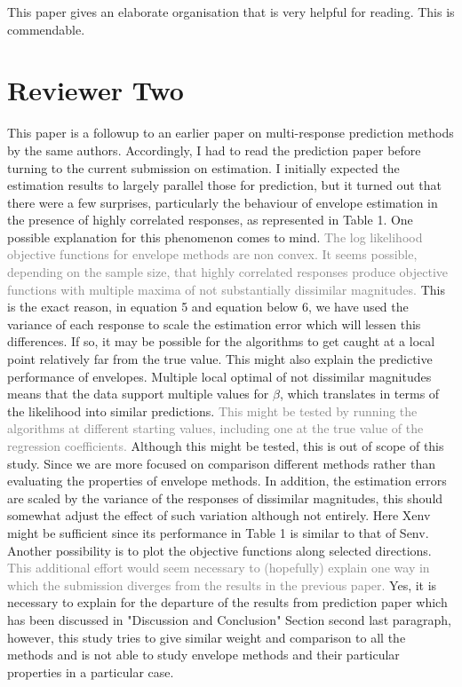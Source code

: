 \documentclass[12pt, a4paper]{scrartcl}
\begin{document}
This paper gives an elaborate organisation that is very helpful for reading. This is commendable.

\section{Reviewer Two}

This paper is a followup to an earlier paper on multi-response prediction methods by the same authors. Accordingly, I had to read the prediction paper before turning to the current submission on estimation. I initially expected the estimation results to largely parallel those for prediction, but it turned out that there were a few surprises, particularly the behaviour of envelope estimation in the presence of highly correlated responses, as represented in Table 1. One possible explanation for this phenomenon comes to mind. \textcolor{gray}{The log likelihood objective functions for envelope methods are non convex. It seems possible, depending on the sample size, that highly correlated responses produce objective functions with multiple maxima of not substantially dissimilar magnitudes.} \textcolor{answers}{This is the exact reason, in equation 5 and equation below 6, we have used the variance of each response to scale the estimation error which will lessen this differences.} If so, it may be possible for the algorithms to get caught at a local point relatively far from the true value. This might also explain the predictive performance of envelopes. Multiple local optimal of not dissimilar magnitudes means that the data support multiple values for $\beta$, which translates in terms of the likelihood into similar predictions. \textcolor{gray}{This might be tested by running the algorithms at different starting values, including one at the true value of the regression coefficients.} \textcolor{answers}{Although this might be tested, this is out of scope of this study. Since we are more focused on comparison different methods rather than evaluating the properties of envelope methods. In addition, the estimation errors are scaled by the variance of the responses of dissimilar magnitudes, this should somewhat adjust the effect of such variation although not entirely.} Here Xenv might be sufficient since its performance in Table 1 is similar to that of Senv. Another possibility is to plot the objective functions along selected directions. \textcolor{gray}{This additional effort would seem necessary to (hopefully) explain one way in which the submission diverges from the results in the previous paper.} \textcolor{answers}{Yes, it is necessary to explain for the departure of the results from prediction paper which has been discussed in "Discussion and Conclusion" Section second last paragraph, however, this study tries to give similar weight and comparison to all the methods and is not able to study envelope methods and their particular properties in a particular case.}
\end{document}
